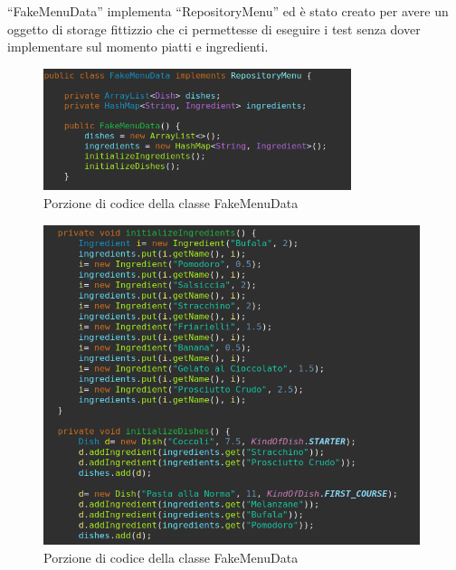 \documentclass{article}
\begin{document}
\newpage

\noindent ``FakeMenuData'' implementa ``RepositoryMenu'' ed \`e stato creato per avere un oggetto di storage fittizzio che ci permettesse di eseguire i test senza dover implementare sul momento piatti e ingredienti.

\begin{figure}[!h]
\centering
\includegraphics[width= 9cm]{"Codice/FakeMenuData1.PNG"}
\caption{Porzione di codice della classe FakeMenuData}
\end{figure}

\begin{figure}[!h]
\centering
\includegraphics[width= 11cm]{"Codice/FakeMenuData2.PNG"}
\caption{Porzione di codice della classe FakeMenuData}
\end{figure}

\newpage
\end{document}
